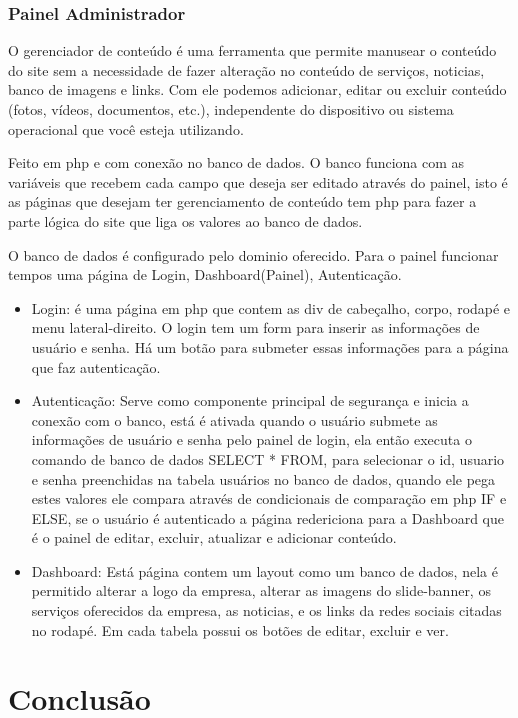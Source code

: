 \documentclass[
	12pt,				%
    oneside,			%
	a4paper,			%
	english,			%
	french,				%
	spanish,			%
	brazil,				%
	]{abntex2}
\begin{document}
\subsection{Painel Administrador}

O gerenciador de conteúdo é uma ferramenta que permite manusear o conteúdo do site sem a necessidade de fazer alteração no conteúdo de serviços, noticias, banco de imagens e links. Com ele podemos adicionar, editar ou excluir conteúdo (fotos, vídeos, documentos, etc.), independente do dispositivo ou sistema operacional que você esteja utilizando.

Feito em php e com conexão no banco de dados. O banco funciona com as variáveis que recebem cada campo que deseja ser editado através do painel, isto é as páginas que desejam ter gerenciamento de conteúdo tem php para fazer a parte lógica do site que liga os valores ao banco de dados. 

O banco de dados é configurado pelo dominio oferecido. Para o painel funcionar tempos uma página de Login, Dashboard(Painel), Autenticação.

\begin{itemize}
	\item{Login: é uma página em php que contem as div de cabeçalho, corpo, rodapé e menu lateral-direito. O login tem um form para inserir as informações de usuário e senha. Há um botão para submeter essas informações para a página que faz autenticação.}
	\item{Autenticação: Serve como componente principal de segurança e inicia a conexão com o banco, está é ativada quando o usuário submete as informações de usuário e senha pelo painel de login, ela então executa o comando de banco de dados SELECT * FROM, para selecionar o id, usuario e senha preenchidas na tabela usuários no banco de dados, quando ele pega estes valores ele compara através de condicionais de comparação em php IF e ELSE, se o usuário é autenticado a página redericiona para a Dashboard que é o painel de editar, excluir, atualizar e adicionar conteúdo.}
	\item{Dashboard: Está página contem um layout como um banco de dados, nela é permitido alterar a logo da empresa, alterar as imagens do slide-banner, os serviços oferecidos da empresa, as noticias, e os links da redes sociais citadas no rodapé. Em cada tabela possui os botões de editar, excluir e ver.}
\end{itemize} 

\chapter[Conclusão]{Conclusão}
\end{document}
